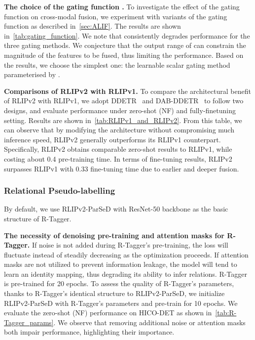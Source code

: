 \textbf{The choice of the gating function .}
To investigate the effect of the gating function on cross-modal fusion, we experiment with variants of the gating function as described in~\cref{sec:ALIF}.
The results are shown in~\cref{tab:gating_function}.
We note that  consistently degrades performance for the three gating methods.
We conjecture that the output range of  can constrain the magnitude of the features to be fused, thus limiting the performance.
Based on the results, we choose the simplest one: the learnable scalar gating method parameterised by .




\textbf{Comparisons of RLIPv2 with RLIPv1.}
To compare the architectural benefit of RLIPv2 with RLIPv1, we adopt DDETR~\cite{zhu2020deformableDETR} and DAB-DDETR~\cite{liu2022DABDETR} to follow two designs, and evaluate performance under zero-shot (NF) and fully-finetuning setting. Results are shown in~\cref{tab:RLIPv1_and_RLIPv2}.
From this table, we can observe that by modifying the architecture without compromising much inference speed, RLIPv2 generally outperforms its RLIPv1 counterpart.
Specifically, RLIPv2 obtains comparable zero-shot results to RLIPv1, while costing about 0.4 pre-training time.
In terms of fine-tuning results, RLIPv2 surpasses RLIPv1 with 0.33 fine-tuning time due to earlier and deeper fusion.






\vspace{-.2cm}
\subsubsection{Relational Pseudo-labelling} \label{sec:exp_relational_pseudo_labelling}
By default, we use RLIPv2-ParSeD with ResNet-50 backbone as the basic structure of R-Tagger.


\textbf{The necessity of denoising pre-training and attention masks for R-Tagger.}
If noise is not added during R-Tagger's pre-training, the loss will fluctuate instead of steadily decreasing as the optimization proceeds.
If attention masks are not utilized to prevent information leakage, the model will tend to learn an identity mapping, thus degrading its ability to infer relations.
R-Tagger is pre-trained for 20 epochs.
To assess the quality of R-Tagger's parameters, thanks to R-Tagger's identical structure to RLIPv2-ParSeD, we initialize RLIPv2-ParSeD with R-Tagger's parameters and pre-train for 10 epochs.
We evaluate the zero-shot (NF) performance on HICO-DET as shown in~\cref{tab:R-Tagger_params}.
We observe that removing additional noise or attention masks both impair performance, highlighting their importance.





